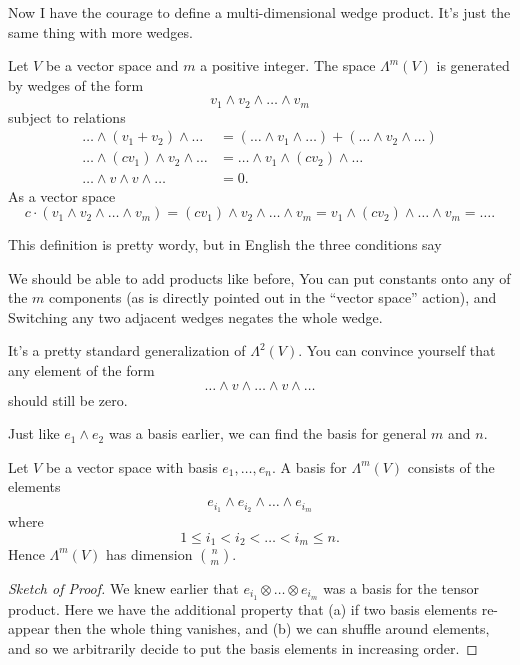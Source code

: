 Now I have the courage to define a multi-dimensional wedge product.
It's just the same thing with more wedges.
\begin{definition}
	Let $V$ be a vector space and $m$ a positive integer.
	The space $\Lambda^m(V)$ is generated by wedges of the form
	\[ v_1 \wedge v_2 \wedge \dots \wedge v_m \]
	subject to relations
	\begin{align*}
		\dots \wedge (v_1+v_2) \wedge \dots
			&= (\dots \wedge v_1 \wedge \dots)
			 + (\dots \wedge v_2 \wedge \dots) \\
		\dots \wedge (cv_1) \wedge v_2 \wedge \dots
			&= \dots \wedge v_1 \wedge (cv_2) \wedge \dots  \\
		\dots \wedge v \wedge v \wedge \dots
			&= 0.
	\end{align*}
	As a vector space
	\[ c \cdot (v_1 \wedge v_2 \wedge \dots \wedge v_m)
	 = (cv_1) \wedge v_2 \wedge \dots \wedge v_m
	 = v_1 \wedge (cv_2) \wedge \dots \wedge v_m
	 = \dots .
	\]
\end{definition}
This definition is pretty wordy, but in English the three conditions say
\begin{itemize}
	\ii We should be able to add products like before,
	\ii You can put constants onto any of the $m$ components
	(as is directly pointed out in the ``vector space'' action), and
	\ii Switching any two adjacent wedges negates the whole wedge.
\end{itemize}
It's a pretty standard generalization of $\Lambda^2(V)$.
You can convince yourself that any element of the form
\[ \dots \wedge v \wedge \dots \wedge v \wedge \dots \]
should still be zero.

Just like $e_1 \wedge e_2$ was a basis earlier, we can find the basis
for general $m$ and $n$.
\begin{proposition}
	Let $V$ be a vector space with basis $e_1, \dots, e_n$.
	A basis for $\Lambda^m(V)$ consists of the elements
	\[ e_{i_1} \wedge e_{i_2} \wedge \dots \wedge e_{i_m} \]
	where
	\[ 1 \le i_1 < i_2 < \dots < i_m \le n. \]
	Hence $\Lambda^m(V)$ has dimension $\binom nm$.
\end{proposition}
\begin{proof}[Sketch of Proof]
	We knew earlier that $e_{i_1} \otimes \dots \otimes e_{i_m}$ was a basis for the tensor product.
	Here we have the additional property that (a) if two basis elements re-appear then the whole thing vanishes, and
	(b) we can shuffle around elements, and so we arbitrarily decide to put the basis elements
	in increasing order.
\end{proof}


